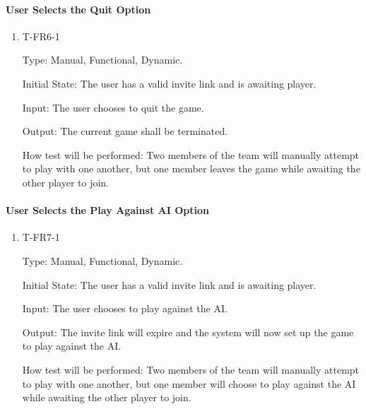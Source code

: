 \documentclass[12pt, titlepage]{article}
\begin{document}
    \paragraph{User Selects the Quit Option}
    
        \begin{enumerate}
        
            \item{T-FR6-1\\}
                
                Type: Manual, Functional, Dynamic.
                					
                Initial State: The user has a valid invite link and is awaiting player.
                					
                Input: The user chooses to quit the game.
                					
                Output: The current game shall be terminated.
                					
                How test will be performed: Two members of the team will manually attempt to play with one another, but one member leaves the game while awaiting the other player to join. 
        
        \end{enumerate}

    \paragraph{User Selects the Play Against AI Option}

        \begin{enumerate}

        \item{T-FR7-1\\}

            Type: Manual, Functional, Dynamic.
            					
            Initial State: The user has a valid invite link and is awaiting player.
            					
            Input: The user chooses to play against the AI.
            					
            Output: The invite link will expire and the system will now set up the game to play against the AI.
            					
            How test will be performed: Two members of the team will manually attempt to play with one another, but one member will choose to play against the AI while awaiting the other player to join. 

        \end{enumerate}
            
\end{document}
